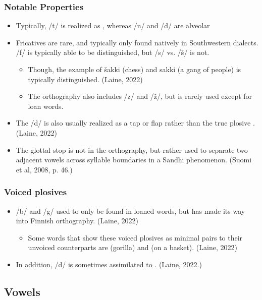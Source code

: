 \documentclass{beamer}
\begin{document}
\begin{frame}
	\frametitle{Notable Properties}
	\begin{itemize}
		\item Typically, /t/ is realized as \textipa{[\|[t]}, whereas /n/ and /d/ are alveolar
		\item Fricatives are rare, and typically only found natively in Southwestern dialects. /f/ is typically able to be distinguished, but /s/ vs. /\v{s}/ \textipa{[S]} is not. 
			\begin{itemize}
				\item Though, the example of \v{s}akki (chess) and sakki (a gang of people) is typically distinguished. (Laine, 2022)
				\item The orthography also includes /z/ and /\v{z}/, but is rarely used except for loan words.
			\end{itemize}
		\item The /d/ is also usually realized as a tap or flap \textipa{[R]} rather than the true plosive \textipa{[d]}. (Laine, 2022)
		\item The glottal stop is not in the orthography, but rather used to separate two adjacent vowels across syllable boundaries in a Sandhi phenomenon. (Suomi et al, 2008, p. 46.)
	\end{itemize}
\end{frame}

\begin{frame}
	\frametitle{Voiced plosives}
	\begin{itemize}
		\item /b/ and /g/ used to only be found in loaned words, but has made its way into Finnish orthography. (Laine, 2022)
			\begin{itemize}
				\item Some words that show these voiced plosives as minimal pairs to their unvoiced counterparts are  (gorilla) and  (on a basket). (Laine, 2022)
			\end{itemize}
		\item In addition, /d/ is sometimes assimilated to \textipa{[t]}. (Laine, 2022.)
	\end{itemize}
\end{frame}

\subsection{Vowels}
\end{document}
